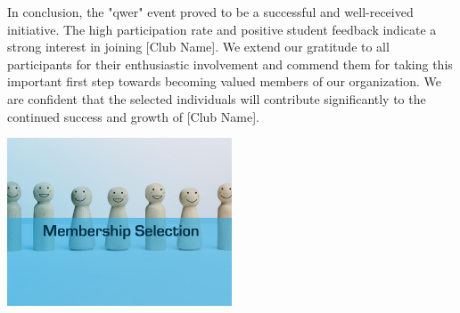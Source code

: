 \documentclass{article}
\begin{document}
In conclusion, the "qwer" event proved to be a successful and well-received initiative. The high participation rate and positive student feedback indicate a strong interest in joining [Club Name]. We extend our gratitude to all participants for their enthusiastic involvement and commend them for taking this important first step towards becoming valued members of our organization. We are confident that the selected individuals will contribute significantly to the continued success and growth of [Club Name].

\vspace{1cm}
\begin{center}
    \includegraphics[width=0.5\textwidth]{photo_1.jpg}
\end{center}
\end{document}
